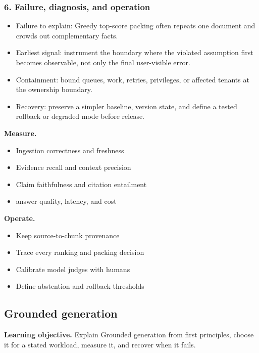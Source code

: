 \subsubsection*{6. Failure, diagnosis, and operation}
\begin{itemize}
\item Failure to explain: Greedy top-score packing often repeats one document and crowds out complementary facts.
\item Earliest signal: instrument the boundary where the violated assumption first becomes observable, not only the final user-visible error.
\item Containment: bound queues, work, retries, privileges, or affected tenants at the ownership boundary.
\item Recovery: preserve a simpler baseline, version state, and define a tested rollback or degraded mode before release.
\end{itemize}
\textbf{Measure.}\begin{itemize}
\item Ingestion correctness and freshness
\item Evidence recall and context precision
\item Claim faithfulness and citation entailment
\item answer quality, latency, and cost
\end{itemize}
\textbf{Operate.}\begin{itemize}
\item Keep source-to-chunk provenance
\item Trace every ranking and packing decision
\item Calibrate model judges with humans
\item Define abstention and rollback thresholds
\end{itemize}
\subsection{Grounded generation}
\textbf{Learning objective.} Explain Grounded generation from first principles, choose it for a stated workload, measure it, and recover when it fails.
